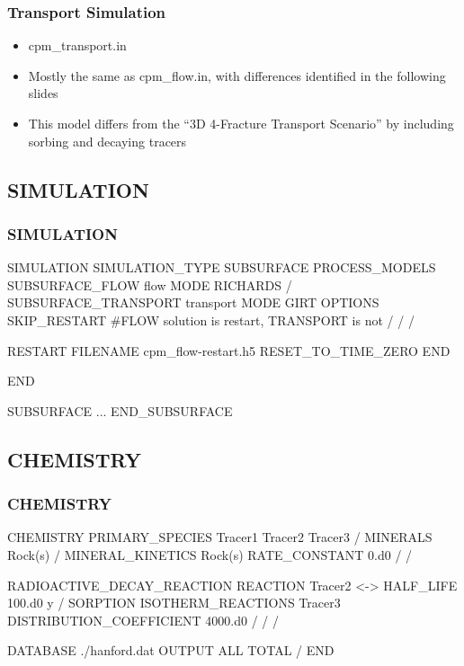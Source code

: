 \documentclass{beamer}
\newcommand\bluecomment[1]{{{\color{blue} #1}}}
\newcommand\magentacomment[1]{{{\color{magenta} #1}}}
\begin{document}
\begin{frame} [fragile,]\frametitle{Transport Simulation}
	\begin{itemize}
		\item cpm\_transport.in
		\item Mostly the same as cpm\_flow.in, with differences identified in the following slides
		\item This model differs from the ``3D 4-Fracture Transport  Scenario'' by including sorbing and decaying tracers
	\end{itemize}

\end{frame}

\subsection{SIMULATION}

\begin{frame}\frametitle{SIMULATION}

	\begin{semiverbatim}
SIMULATION
  SIMULATION_TYPE SUBSURFACE
  PROCESS_MODELS
    SUBSURFACE_FLOW flow
    MODE RICHARDS
  /
  \magentacomment{SUBSURFACE_TRANSPORT transport
    MODE GIRT
    OPTIONS
      SKIP_RESTART \bluecomment{#FLOW solution is restart, 
      	TRANSPORT is not}
    /
  /}
/



  \magentacomment{RESTART
    FILENAME cpm_flow-restart.h5
    RESET_TO_TIME_ZERO
  END}

END

SUBSURFACE
...
END_SUBSURFACE
	\end{semiverbatim}
\end{frame}


\subsection{CHEMISTRY}
\begin{frame}\frametitle{CHEMISTRY}
	
	\begin{semiverbatim}
CHEMISTRY
  PRIMARY_SPECIES
    Tracer1
    Tracer2
    Tracer3
  /
  MINERALS
    Rock(s)
  /
  MINERAL_KINETICS
    Rock(s)
      RATE_CONSTANT 0.d0
    /
  /
  
  
  RADIOACTIVE_DECAY_REACTION
    REACTION Tracer2 <->
    HALF_LIFE 100.d0 y
  /
  SORPTION
    ISOTHERM_REACTIONS
      Tracer3
        DISTRIBUTION_COEFFICIENT 4000.d0
      /
    /
  /
  
  
  
  
  
  DATABASE ./hanford.dat
  OUTPUT
    ALL
    TOTAL
  /
END
	\end{semiverbatim}
\end{frame}
\end{document}
